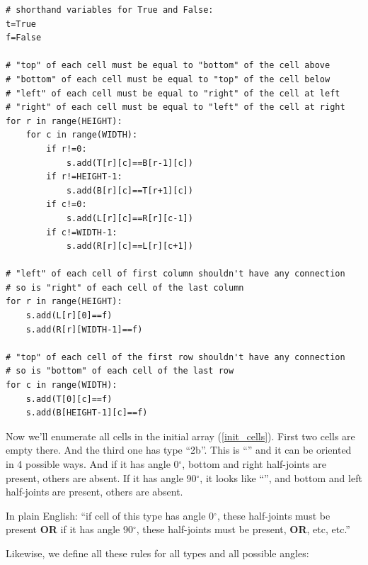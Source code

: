 \begin{lstlisting}
# shorthand variables for True and False:
t=True
f=False

# "top" of each cell must be equal to "bottom" of the cell above
# "bottom" of each cell must be equal to "top" of the cell below
# "left" of each cell must be equal to "right" of the cell at left
# "right" of each cell must be equal to "left" of the cell at right
for r in range(HEIGHT):
    for c in range(WIDTH):
        if r!=0:
            s.add(T[r][c]==B[r-1][c])
        if r!=HEIGHT-1:
            s.add(B[r][c]==T[r+1][c])
        if c!=0:
            s.add(L[r][c]==R[r][c-1])
        if c!=WIDTH-1:
            s.add(R[r][c]==L[r][c+1])

# "left" of each cell of first column shouldn't have any connection
# so is "right" of each cell of the last column
for r in range(HEIGHT):
    s.add(L[r][0]==f)
    s.add(R[r][WIDTH-1]==f)

# "top" of each cell of the first row shouldn't have any connection
# so is "bottom" of each cell of the last row
for c in range(WIDTH):
    s.add(T[0][c]==f)
    s.add(B[HEIGHT-1][c]==f)
\end{lstlisting}

Now we'll enumerate all cells in the initial array (\ref{init_cells}).
First two cells are empty there. And the third one has type ``2b''.
This is ``'' %
and it can be oriented in 4 possible ways.
And if it has angle 0$^{\circ}$, bottom and right half-joints are present, others are absent.
If it has angle 90$^{\circ}$, it looks like 
``'', %
and bottom and left half-joints are present, others are absent.

In plain English: ``if cell of this type has angle 0$^{\circ}$, these half-joints must be present \textbf{OR}
if it has angle 90$^{\circ}$, these half-joints must be present, \textbf{OR}, etc, etc.''

Likewise, we define all these rules for all types and all possible angles:

